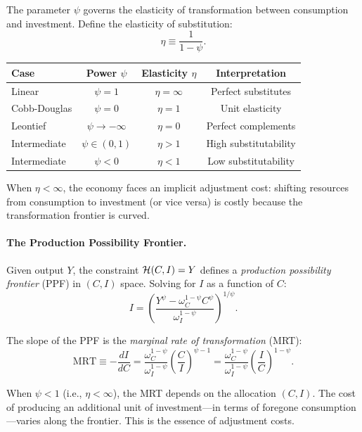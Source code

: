 The parameter $\psi$ governs the elasticity of transformation between consumption and investment. Define the elasticity of substitution:
\begin{equation}
\eta \equiv \frac{1}{1 - \psi}.
\label{eq:ac-eta-def}
\end{equation}

\begin{center}
\begin{tabular}{@{}lccc@{}}
\toprule
Case & Power $\psi$ & Elasticity $\eta$ & Interpretation \\
\midrule
Linear & $\psi = 1$ & $\eta = \infty$ & Perfect substitutes \\
Cobb-Douglas & $\psi = 0$ & $\eta = 1$ & Unit elasticity \\
Leontief & $\psi \to -\infty$ & $\eta = 0$ & Perfect complements \\
Intermediate & $\psi \in (0,1)$ & $\eta > 1$ & High substitutability \\
Intermediate & $\psi < 0$ & $\eta < 1$ & Low substitutability \\
\bottomrule
\end{tabular}
\end{center}

When $\eta < \infty$, the economy faces an implicit adjustment cost: shifting resources from consumption to investment (or vice versa) is costly because the transformation frontier is curved.

\paragraph{The Production Possibility Frontier.}
Given output $Y$, the constraint $\mathcal{H}(C, I) = Y$ defines a \emph{production possibility frontier} (PPF) in $(C, I)$ space. Solving for $I$ as a function of $C$:
\begin{equation}
I = \left( \frac{Y^{\psi} - \omega_C^{1-\psi} C^{\psi}}{\omega_I^{1-\psi}} \right)^{1/\psi}.
\label{eq:ac-ppf}
\end{equation}

The slope of the PPF is the \emph{marginal rate of transformation} (MRT):
\begin{equation}
\text{MRT} \equiv -\frac{dI}{dC} = \frac{\omega_C^{1-\psi}}{\omega_I^{1-\psi}} \left( \frac{C}{I} \right)^{\psi - 1} = \frac{\omega_C^{1-\psi}}{\omega_I^{1-\psi}} \left( \frac{I}{C} \right)^{1-\psi}.
\label{eq:ac-mrt}
\end{equation}

When $\psi < 1$ (i.e., $\eta < \infty$), the MRT depends on the allocation $(C, I)$. The cost of producing an additional unit of investment---in terms of foregone consumption---varies along the frontier. This is the essence of adjustment costs.

